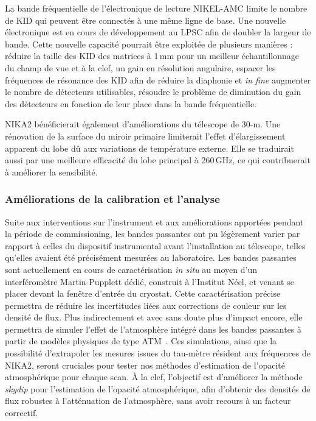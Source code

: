 La bande fréquentielle de l'électronique de lecture NIKEL-AMC limite
le nombre de KID qui peuvent être connectés à une même ligne de
base. Une nouvelle électronique est en cours de développement au LPSC
afin de doubler la largeur de bande. Cette nouvelle capacité pourrait
être exploitée de plusieurs manières : réduire la taille des KID des
matrices à 1\,mm pour un meilleur échantillonnage du champ de vue et à
la clef, un gain en résolution angulaire, espacer les fréquences de
résonance des KID afin de réduire la diaphonie et \emph{in fine}
augmenter le nombre de détecteurs utilisables, résoudre le problème de
diminution du gain des détecteurs en fonction de leur place dans la
bande fréquentielle. 

NIKA2 bénéficierait également d'améliorations du télescope de
30-m. Une rénovation de la surface du miroir primaire limiterait
l'effet d'élargissement apparent du lobe dû aux variations de
température externe. Elle se traduirait aussi par une meilleure
efficacité du lobe principal à 260\,GHz, ce qui contribuerait à
améliorer la sensibilité. 

\subsubsection{Améliorations de la calibration et l'analyse}

Suite aux interventions sur l'instrument et aux améliorations
apportées pendant la période de commissioning, les bandes passantes
ont pu légèrement varier par rapport à celles du dispositif
instrumental avant l'installation au télescope, telles qu'elles
avaient été précisément mesurées au laboratoire. Les bandes passantes
sont actuellement en cours de caractérisation \emph{in situ} au moyen
d'un interféromètre Martin-Pupplett dédié, construit à l'Institut
Néel, et venant se placer devant la fenêtre d'entrée du
cryostat. Cette caractérisation précise permettra de réduire les
incertitudes liées aux corrections de couleur sur les
densité de flux. Plus indirectement et avec sans doute plus d'impact
encore, elle permettra de simuler l'effet de l'atmosphère intégré dans
les bandes passantes à partir de modèles physiques de type
ATM~\citep{Pardo2001, ATM}. Ces simulations, ainsi que la possibilité
d'extrapoler les mesures issues du tau-mètre résident aux fréquences
de NIKA2, seront cruciales pour tester nos méthodes d'estimation de
l'opacité atmosphérique pour chaque scan. \`A la clef, l'objectif est
d'améliorer la méthode \emph{skydip} pour l'estimation de l'opacité
atmosphérique, afin d'obtenir des densités de flux robustes à
l'atténuation de l'atmosphère, sans avoir recours à un facteur
correctif.

